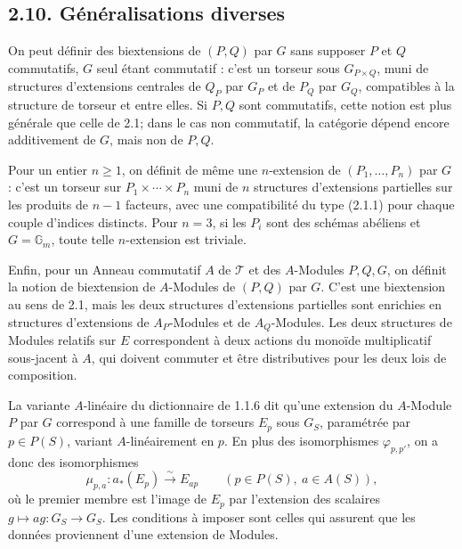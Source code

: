 \documentclass[11pt]{article}
\begin{document}
\subsection*{2.10. Généralisations diverses}
On peut définir des biextensions de \((P,Q)\) par \(G\) sans supposer \(P\) et \(Q\) commutatifs, \(G\) seul étant commutatif : c'est un torseur sous \(G_{P\times Q}\), muni de structures d'extensions centrales de \(Q_P\) par \(G_P\) et de \(P_Q\) par \(G_Q\), compatibles à la structure de torseur et entre elles.  Si \(P,Q\) sont commutatifs, cette notion est plus générale que celle de 2.1; dans le cas non commutatif, la catégorie dépend encore additivement de \(G\), mais non de \(P,Q\).

Pour un entier \(n\geq1\), on définit de même une \(n\)-extension de \((P_1,
\ldots,P_n)\) par \(G\) : c'est un torseur sur \(P_1\times\cdots\times P_n\) muni de \(n\) structures d'extensions partielles sur les produits de \(n-1\) facteurs, avec une compatibilité du type (2.1.1) pour chaque couple d'indices distincts.  Pour \(n=3\), si les \(P_i\) sont des schémas abéliens et \(G=\mathbb G_m\), toute telle \(n\)-extension est triviale.

Enfin, pour un Anneau commutatif \(A\) de \(\mathcal T\) et des \(A\)-Modules \(P,Q,G\), on définit la notion de biextension de \(A\)-Modules de \((P,Q)\) par \(G\).  C'est une biextension au sens de 2.1, mais les deux structures d'extensions partielles sont enrichies en structures d'extensions de \(A_P\)-Modules et de \(A_Q\)-Modules.  Les deux structures de Modules relatifs sur \(E\) correspondent à deux actions du monoïde multiplicatif sous-jacent à \(A\), qui doivent commuter et être distributives pour les deux lois de composition.

La variante \(A\)-linéaire du dictionnaire de 1.1.6 dit qu'une extension du \(A\)-Module \(P\) par \(G\) correspond à une famille de torseurs \(E_p\) sous \(G_S\), paramétrée par \(p\in P(S)\), variant \(A\)-linéairement en \(p\).  En plus des isomorphismes \(\varphi_{p,p'}\), on a donc des isomorphismes
\begin{equation}\tag{2.10.3.1}
  \mu_{p,a}:a_*(E_p)\xrightarrow{\sim}E_{ap}
  \qquad(p\in P(S),\ a\in A(S)),
\end{equation}
où le premier membre est l'image de \(E_p\) par l'extension des scalaires \(g\mapsto ag:G_S\to G_S\).  Les conditions à imposer sont celles qui assurent que les données proviennent d'une extension de Modules.
\end{document}
